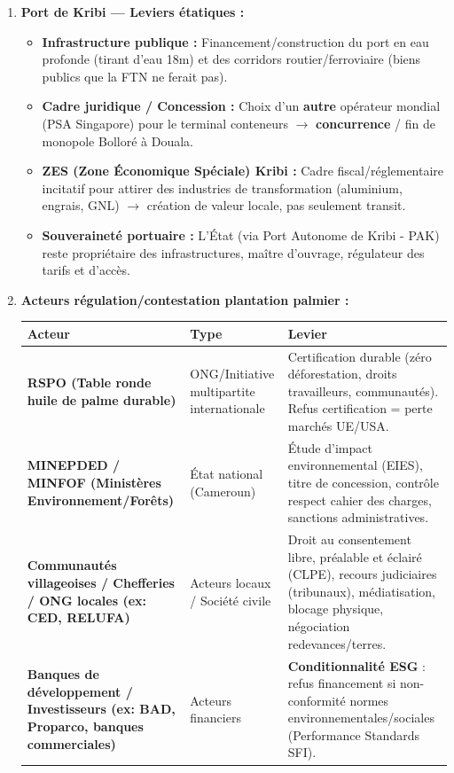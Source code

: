 \documentclass[11pt]{article}
\begin{document}
\begin{corrige}
\begin{enumerate}
    \item \textbf{Port de Kribi — Leviers étatiques :}
    \begin{itemize}
        \item \textbf{Infrastructure publique :} Financement/construction du port en eau profonde (tirant d'eau 18m) et des corridors routier/ferroviaire (biens publics que la FTN ne ferait pas).
        \item \textbf{Cadre juridique / Concession :} Choix d'un \textbf{autre} opérateur mondial (PSA Singapore) pour le terminal conteneurs $\to$ \textbf{concurrence} / fin de monopole Bolloré à Douala.
        \item \textbf{ZES (Zone Économique Spéciale) Kribi :} Cadre fiscal/réglementaire incitatif pour attirer des industries de transformation (aluminium, engrais, GNL) $\to$ création de valeur locale, pas seulement transit.
        \item \textbf{Souveraineté portuaire :} L'État (via Port Autonome de Kribi - PAK) reste propriétaire des infrastructures, maître d'ouvrage, régulateur des tarifs et d'accès.
    \end{itemize}
    \item \textbf{Acteurs régulation/contestation plantation palmier :}
    \begin{tabularx}{\linewidth}{|l|X|X|}
    \hline
    \textbf{Acteur} & \textbf{Type} & \textbf{Levier} \\
    \hline
    \textbf{RSPO (Table ronde huile de palme durable)} & ONG/Initiative multipartite internationale & Certification durable (zéro déforestation, droits travailleurs, communautés). Refus certification = perte marchés UE/USA. \\
    \hline
    \textbf{MINEPDED / MINFOF (Ministères Environnement/Forêts)} & État national (Cameroun) & Étude d'impact environnemental (EIES), titre de concession, contrôle respect cahier des charges, sanctions administratives. \\
    \hline
    \textbf{Communautés villageoises / Chefferies / ONG locales (ex: CED, RELUFA)} & Acteurs locaux / Société civile & Droit au consentement libre, préalable et éclairé (CLPE), recours judiciaires (tribunaux), médiatisation, blocage physique, négociation redevances/terres. \\
    \hline
    \textbf{Banques de développement / Investisseurs (ex: BAD, Proparco, banques commerciales)} & Acteurs financiers & \textbf{Conditionnalité ESG} : refus financement si non-conformité normes environnementales/sociales (Performance Standards SFI). \\

\end{tabularx}
\end{enumerate}
\end{corrige}
\end{document}
